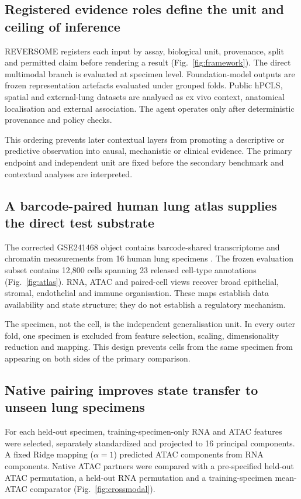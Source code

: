 \documentclass[11pt]{article}
\begin{document}
\subsection*{Registered evidence roles define the unit and ceiling of inference}

REVERSOME registers each input by assay, biological unit, provenance, split and permitted claim before rendering a result (Fig.~\ref{fig:framework}). The direct multimodal branch is evaluated at specimen level. Foundation-model outputs are frozen representation artefacts evaluated under grouped folds. Public hPCLS, spatial and external-lung datasets are analysed as ex vivo context, anatomical localisation and external association. The agent operates only after deterministic provenance and policy checks.

This ordering prevents later contextual layers from promoting a descriptive or predictive observation into causal, mechanistic or clinical evidence. The primary endpoint and independent unit are fixed before the secondary benchmark and contextual analyses are interpreted.

\subsection*{A barcode-paired human lung atlas supplies the direct test substrate}

The corrected GSE241468 object contains barcode-shared transcriptome and chromatin measurements from 16 human lung specimens \cite{Long2024}. The frozen evaluation subset contains 12,800 cells spanning 23 released cell-type annotations (Fig.~\ref{fig:atlas}). RNA, ATAC and paired-cell views recover broad epithelial, stromal, endothelial and immune organisation. These maps establish data availability and state structure; they do not establish a regulatory mechanism.

The specimen, not the cell, is the independent generalisation unit. In every outer fold, one specimen is excluded from feature selection, scaling, dimensionality reduction and mapping. This design prevents cells from the same specimen from appearing on both sides of the primary comparison.

\subsection*{Native pairing improves state transfer to unseen lung specimens}

For each held-out specimen, training-specimen-only RNA and ATAC features were selected, separately standardized and projected to 16 principal components. A fixed Ridge mapping ($\alpha=1$) predicted ATAC components from RNA components. Native ATAC partners were compared with a pre-specified held-out ATAC permutation, a held-out RNA permutation and a training-specimen mean-ATAC comparator (Fig.~\ref{fig:crossmodal}).
\end{document}

